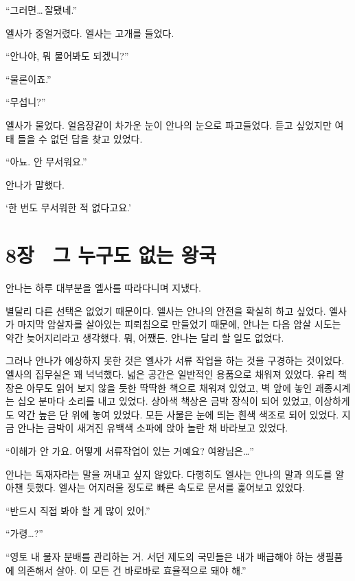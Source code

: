 ``그러면\ldots\,잘됐네.''

엘사가 중얼거렸다. 엘사는 고개를 들었다.

``안나야, 뭐 물어봐도 되겠니?''

``물론이죠.''

`` 무섭니?''

엘사가 물었다. 얼음장같이 차가운 눈이 안나의 눈으로 파고들었다. 듣고 싶었지만 여태 들을 수 없던 답을 찾고 있었다.

``아뇨. 안 무서워요.''

안나가 말했다.

`한 번도 무서워한 적 없다고요.'



\chapter[8장  그 누구도 없는 왕국][8장\hspace*{.5em}그 누구도 없는 왕국]{8장 \ 그 누구도 없는 왕국}



안나는 하루 대부분을 엘사를 따라다니며 지냈다.

별달리 다른 선택은 없었기 때문이다. 엘사는 안나의 안전을 확실히 하고 싶었다. 엘사가 마지막 암살자를 살아있는 피뢰침으로 만들었기 때문에, 안나는 다음 암살 시도는 약간 늦어지리라고 생각했다. 뭐, 어쨌든. 안나는 달리 할 일도 없었다.

그러나 안나가 예상하지 못한 것은 엘사가 서류 작업을 하는 것을 구경하는 것이었다. 엘사의 집무실은 꽤 넉넉했다. 넓은 공간은 일반적인 용품으로 채워져 있었다. 유리 책장은 아무도 읽어 보지 않을 듯한 딱딱한 책으로 채워져 있었고, 벽 앞에 놓인 괘종시계는 십오 분마다 소리를 내고 있었다. 상아색 책상은 금박 장식이 되어 있었고, 이상하게도 약간 높은 단 위에 놓여 있었다. 모든 사물은 눈에 띄는 흰색 색조로 되어 있었다. 지금 안나는 금박이 새겨진 유백색 소파에 앉아 놀란 채 바라보고 있었다.

``이해가 안 가요. 어떻게 서류작업이 있는 거예요? 여왕님은\ldots''

안나는 독재자라는 말을 꺼내고 싶지 않았다. 다행히도 엘사는 안나의 말과 의도를 알아챈 듯했다. 엘사는 어지러울 정도로 빠른 속도로 문서를 훑어보고 있었다.

``반드시 직접 봐야 할 게 많이 있어.''

``가령\ldots?''

``영토 내 물자 분배를 관리하는 거. 서던 제도의 국민들은 내가 배급해야 하는 생필품에 의존해서 살아. 이 모든 건 바로바로 효율적으로 돼야 해.''

